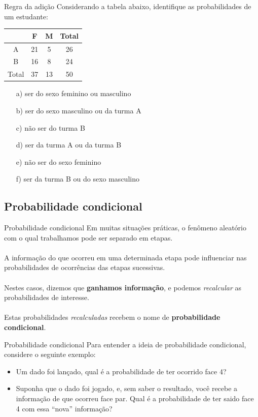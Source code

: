 \documentclass[10pt]{beamer}\usepackage[]{graphicx}\usepackage[]{color}
\theoremstyle{definition}
\begin{document}
\begin{frame}[fragile]{Regra da adição}
  Considerando a tabela abaixo, identifique as probabilidades de um
  estudante:
  \begin{table}
    \centering
    \begin{tabular}{c|cc|c}
      \hline
      & F & M & Total \\
      \hline
      A & 21 & 5 & 26 \\
      B & 16 & 8 & 24 \\
      \hline
      Total & 37 & 13 & 50 \\
      \hline
    \end{tabular}
  \end{table}
  \begin{itemize}
  \item[a)] ser do sexo feminino ou masculino
  \item[b)] ser do sexo masculino ou da turma A
  \item[c)] não ser do turma B
  \item[d)] ser da turma A ou da turma B
  \item[e)] não ser do sexo feminino
  \item[f)] ser da turma B ou do sexo masculino
  \end{itemize}
\end{frame}

\subsection{Probabilidade condicional}

\begin{frame}{Probabilidade condicional}
  Em muitas situações práticas, o fenômeno aleatório com o qual
  trabalhamos pode ser separado em etapas.\\~\\
  A informação do que ocorreu em uma determinada etapa pode influenciar
  nas probabilidades de ocorrências das etapas sucessivas.\\~\\
  Nestes casos, dizemos que \textbf{ganhamos informação}, e podemos
  \textsl{recalcular} as probabilidades de interesse. \\~\\
  Estas probabilidades \textsl{recalculadas} recebem o nome de
  \textbf{probabilidade condicional}.
\end{frame}

\begin{frame}{Probabilidade condicional}
 Para entender a ideia de probabilidade condicional, considere o
 seguinte exemplo:
 \begin{itemize}
 \item Um dado foi lançado, qual é a probabilidade de ter ocorrido face
   4?
 \item Suponha que o dado foi jogado, e, sem saber o resultado, você
   recebe a informação de que ocorreu face par. Qual é a probabilidade
   de ter saido face 4 com essa ``nova'' informação?
 \end{itemize}
\end{frame}
\end{document}
